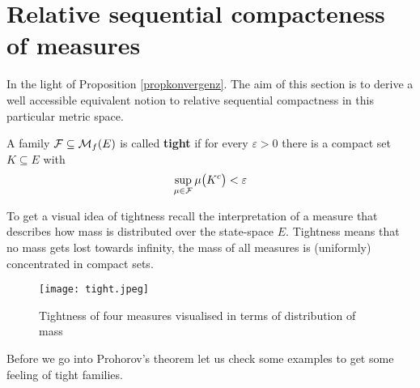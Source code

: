 	\marginpar{\textcolor{red}{Lecture 13}}

\section[Relative sequential compacteness of measures]{Relative sequential compacteness of measures}\label{sec:tight}




In the light of Proposition \ref{propkonvergenz}. The aim of this section is to derive a well accessible equivalent notion to relative sequential compactness in this particular metric space. 

\begin{ldef}
\begin{deff}\label{def_tight}
	A family $\mathcal{F} \subseteq \mathcal{M}_f(E)$ is called \textbf{tight}  if for every $\varepsilon>0$ there is a compact set $K \subseteq E$ with $$ \sup_{\mu \in \mathcal{F}} \mu \big(K^c\big) < \varepsilon$$
\end{deff}
\end{ldef}
To get a visual idea of tightness recall the interpretation of a measure that describes how mass is distributed over the state-space $E$. Tightness means that no mass gets lost towards infinity, the mass of all measures is (uniformly) concentrated in compact sets. 
\begin{figure}[h]
			\begin{center}
				\texttt{[image: tight.jpeg]}
			\end{center}
			\vspace{-7mm}
			\caption*{Tightness of four measures visualised in terms of distribution of mass}
			\end{figure}
			Before we go into Prohorov's theorem let us check some examples to get some feeling of tight families.

